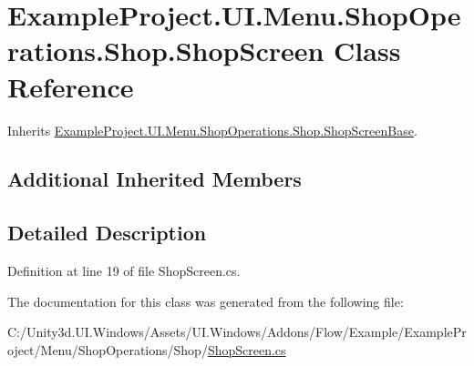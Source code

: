 \hypertarget{class_example_project_1_1_u_i_1_1_menu_1_1_shop_operations_1_1_shop_1_1_shop_screen}{}\section{Example\+Project.\+U\+I.\+Menu.\+Shop\+Operations.\+Shop.\+Shop\+Screen Class Reference}
\label{class_example_project_1_1_u_i_1_1_menu_1_1_shop_operations_1_1_shop_1_1_shop_screen}


Inherits \hyperlink{class_example_project_1_1_u_i_1_1_menu_1_1_shop_operations_1_1_shop_1_1_shop_screen_base}{Example\+Project.\+U\+I.\+Menu.\+Shop\+Operations.\+Shop.\+Shop\+Screen\+Base}.

\subsection*{Additional Inherited Members}


\subsection{Detailed Description}


Definition at line 19 of file Shop\+Screen.\+cs.



The documentation for this class was generated from the following file\+:\begin{DoxyCompactItemize}
\item 
C\+:/\+Unity3d.\+U\+I.\+Windows/\+Assets/\+U\+I.\+Windows/\+Addons/\+Flow/\+Example/\+Example\+Project/\+Menu/\+Shop\+Operations/\+Shop/\hyperlink{_shop_screen_8cs}{Shop\+Screen.\+cs}\end{DoxyCompactItemize}
